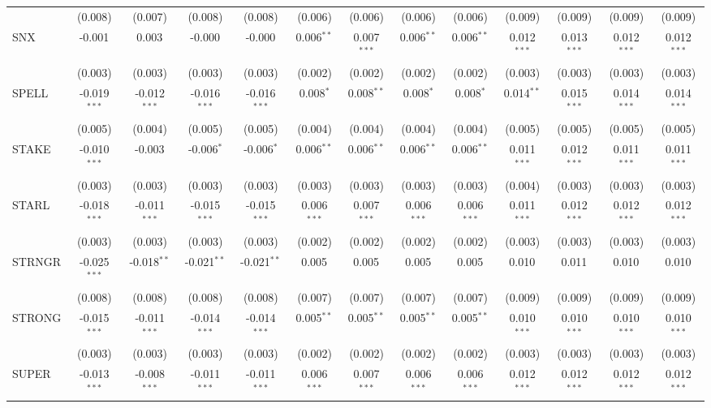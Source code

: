 \begin{table}[!htbp]
\begin{tabular}{@{\extracolsep{5pt}}lcccccccccccc}
  & (0.008) & (0.007) & (0.008) & (0.008) & (0.006) & (0.006) & (0.006) & (0.006) & (0.009) & (0.009) & (0.009) & (0.009) \\
 SNX & -0.001$^{}$ & 0.003$^{}$ & -0.000$^{}$ & -0.000$^{}$ & 0.006$^{**}$ & 0.007$^{***}$ & 0.006$^{**}$ & 0.006$^{**}$ & 0.012$^{***}$ & 0.013$^{***}$ & 0.012$^{***}$ & 0.012$^{***}$ \\
  & (0.003) & (0.003) & (0.003) & (0.003) & (0.002) & (0.002) & (0.002) & (0.002) & (0.003) & (0.003) & (0.003) & (0.003) \\
 SPELL & -0.019$^{***}$ & -0.012$^{***}$ & -0.016$^{***}$ & -0.016$^{***}$ & 0.008$^{*}$ & 0.008$^{**}$ & 0.008$^{*}$ & 0.008$^{*}$ & 0.014$^{**}$ & 0.015$^{***}$ & 0.014$^{***}$ & 0.014$^{***}$ \\
  & (0.005) & (0.004) & (0.005) & (0.005) & (0.004) & (0.004) & (0.004) & (0.004) & (0.005) & (0.005) & (0.005) & (0.005) \\
 STAKE & -0.010$^{***}$ & -0.003$^{}$ & -0.006$^{*}$ & -0.006$^{*}$ & 0.006$^{**}$ & 0.006$^{**}$ & 0.006$^{**}$ & 0.006$^{**}$ & 0.011$^{***}$ & 0.012$^{***}$ & 0.011$^{***}$ & 0.011$^{***}$ \\
  & (0.003) & (0.003) & (0.003) & (0.003) & (0.003) & (0.003) & (0.003) & (0.003) & (0.004) & (0.003) & (0.003) & (0.003) \\
 STARL & -0.018$^{***}$ & -0.011$^{***}$ & -0.015$^{***}$ & -0.015$^{***}$ & 0.006$^{***}$ & 0.007$^{***}$ & 0.006$^{***}$ & 0.006$^{***}$ & 0.011$^{***}$ & 0.012$^{***}$ & 0.012$^{***}$ & 0.012$^{***}$ \\
  & (0.003) & (0.003) & (0.003) & (0.003) & (0.002) & (0.002) & (0.002) & (0.002) & (0.003) & (0.003) & (0.003) & (0.003) \\
 STRNGR & -0.025$^{***}$ & -0.018$^{**}$ & -0.021$^{**}$ & -0.021$^{**}$ & 0.005$^{}$ & 0.005$^{}$ & 0.005$^{}$ & 0.005$^{}$ & 0.010$^{}$ & 0.011$^{}$ & 0.010$^{}$ & 0.010$^{}$ \\
  & (0.008) & (0.008) & (0.008) & (0.008) & (0.007) & (0.007) & (0.007) & (0.007) & (0.009) & (0.009) & (0.009) & (0.009) \\
 STRONG & -0.015$^{***}$ & -0.011$^{***}$ & -0.014$^{***}$ & -0.014$^{***}$ & 0.005$^{**}$ & 0.005$^{**}$ & 0.005$^{**}$ & 0.005$^{**}$ & 0.010$^{***}$ & 0.010$^{***}$ & 0.010$^{***}$ & 0.010$^{***}$ \\
  & (0.003) & (0.003) & (0.003) & (0.003) & (0.002) & (0.002) & (0.002) & (0.002) & (0.003) & (0.003) & (0.003) & (0.003) \\
 SUPER & -0.013$^{***}$ & -0.008$^{***}$ & -0.011$^{***}$ & -0.011$^{***}$ & 0.006$^{***}$ & 0.007$^{***}$ & 0.006$^{***}$ & 0.006$^{***}$ & 0.012$^{***}$ & 0.012$^{***}$ & 0.012$^{***}$ & 0.012$^{***}$ \\

\end{tabular}
\end{table}
